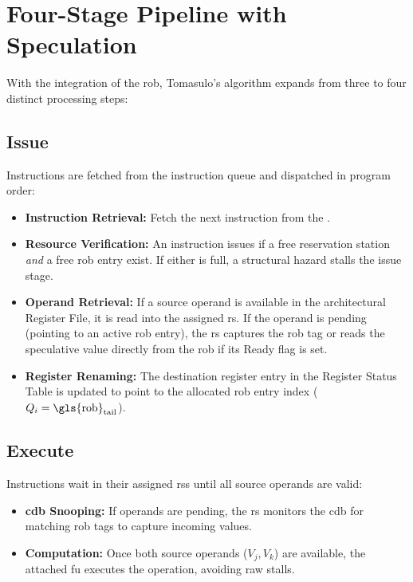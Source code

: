 \section{Four-Stage Pipeline with Speculation}

With the integration of the \gls{rob}, Tomasulo's algorithm expands from three to four distinct processing steps:

\subsection{Issue}
Instructions are fetched from the instruction queue and dispatched in program order:
\begin{itemize}
    \item \textbf{Instruction Retrieval:} Fetch the next instruction from the .
    \item \textbf{Resource Verification:} An instruction issues if a free reservation station \textit{and} a free \gls{rob} entry exist. If either is full, a structural hazard stalls the issue stage.
    \item \textbf{Operand Retrieval:} If a source operand is available in the architectural Register File, it is read into the assigned \gls{rs}. If the operand is pending (pointing to an active \gls{rob} entry), the \gls{rs} captures the \gls{rob} tag or reads the speculative value directly from the \gls{rob} if its Ready flag is set.
    \item \textbf{Register Renaming:} The destination register entry in the Register Status Table is updated to point to the allocated \gls{rob} entry index ($Q_i = \text{\gls{rob}}_{\text{tail}}$).
\end{itemize}

\subsection{Execute}
Instructions wait in their assigned \glspl{rs} until all source operands are valid:
\begin{itemize}
    \item \textbf{\gls{cdb} Snooping:} If operands are pending, the \gls{rs} monitors the \gls{cdb} for matching \gls{rob} tags to capture incoming values.
    \item \textbf{Computation:} Once both source operands ($V_j, V_k$) are available, the attached \gls{fu} executes the operation, avoiding \gls{raw} stalls.
\end{itemize}

